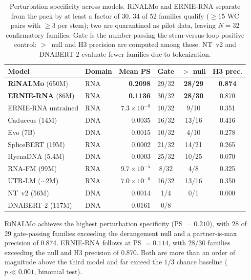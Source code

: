 \documentclass[11pt]{article}
\begin{document}
\begin{table}[htbp]
\centering
\caption{Perturbation specificity across models. RiNALMo and
ERNIE-RNA separate from the pack by at least a factor of 30.
34 of 52 families qualify ($\geq 15$ WC pairs with $\geq 3$
per stem); two are quarantined as pilot data, leaving $N = 32$
confirmatory families. Gate is the number passing the stem-versus-loop
positive control; $>$~null and H3 precision are computed among those.
NT~v2 and DNABERT-2 evaluate fewer families due to tokenization.}
\label{tab:rung3}
\small
\begin{tabular}{llrccc}
\toprule
\textbf{Model} & \textbf{Domain} & \textbf{Mean PS} & \textbf{Gate} & \textbf{$>$ null} & \textbf{H3 prec.} \\
\midrule
\textbf{RiNALMo} (650M)    & RNA & \textbf{0.2098} & 29/32 & \textbf{28/29} & \textbf{0.874} \\
\textbf{ERNIE-RNA} (86M)  & RNA & \textbf{0.1136} & 30/32 & \textbf{28/30} & 0.870 \\
ERNIE-RNA untrained        & RNA & $7.3 \times 10^{-8}$ & 10/32 & 9/10 & 0.351 \\
Caduceus (14M)             & DNA & 0.0035 & 16/32 & 13/16 & 0.416 \\
Evo (7B)                   & DNA & 0.0015 & 10/32 & 4/10 & 0.278 \\
SpliceBERT (19M)           & RNA & 0.0002 & 21/32 & 14/21 & 0.265 \\
HyenaDNA (5.4M)            & DNA & 0.0003 & 25/32 & 10/25 & 0.070 \\
RNA-FM (99M)               & RNA & $9.7 \times 10^{-5}$ & 8/32 & 4/8 & 0.325 \\
UTR-LM ($\sim$2M)          & RNA & $7.0 \times 10^{-6}$ & 16/32 & 13/16 & 0.350 \\
NT~v2 (56M)                & DNA & 0.0014 & 1/4 & 0/1 & 0.000 \\
DNABERT-2 (117M)           & DNA & $-0.0161$ & 0/8 & --- & --- \\
\bottomrule
\end{tabular}
\end{table}

RiNALMo achieves the highest perturbation specificity (PS $= 0.210$),
with 28 of 29 gate-passing families exceeding the derangement null
and a partner-is-max precision of 0.874.
ERNIE-RNA follows at PS $= 0.114$, with 28/30 families exceeding the
null and H3 precision of 0.870. Both are more than an order
of magnitude above the third model and far exceed the
$1/3$ chance baseline ($p \ll 0.001$, binomial test).
\end{document}
